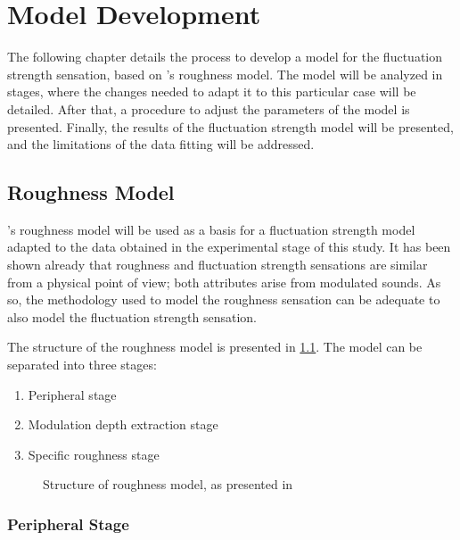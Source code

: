 \documentclass[../main.tex]{subfiles}
\begin{document}
\chapter{Model Development}

\begin{modelchapter}

The following chapter details the process to develop a model for the fluctuation
strength sensation, based on \citeauthor{daniel1997psychoacoustical}'s roughness
model. The model will be analyzed in stages, where the changes needed to adapt
it to this particular case will be detailed. After that, a procedure to adjust
the parameters of the model is presented. Finally, the results of the
fluctuation strength model will be presented, and the limitations of the data
fitting will be addressed.

\section{Roughness Model}

\citeauthor{daniel1997psychoacoustical}'s roughness model will be used as a
basis for a fluctuation strength model adapted to the data obtained in the
experimental stage of this study. It has been shown already that roughness and
fluctuation strength sensations are similar from a physical point of view; both
attributes arise from modulated sounds. As so, the methodology used to model
the roughness sensation can be adequate to also model the fluctuation strength
sensation.

The structure of the roughness model is presented in \cref{fig:roughness_model}.
The model can be separated into three stages:
\begin{enumerate}
  \item Peripheral stage
  \item Modulation depth extraction stage
  \item Specific roughness stage
\end{enumerate}

\begin{figure}[!ht]
  \centering
  \resizebox{!}{15cm}{}
  \caption{Structure of roughness model, as presented in
    \cite[pp.~116]{daniel1997psychoacoustical}}
  \label{fig:roughness_model}
\end{figure}

\subsection{Peripheral Stage}


\end{modelchapter}
\end{document}
